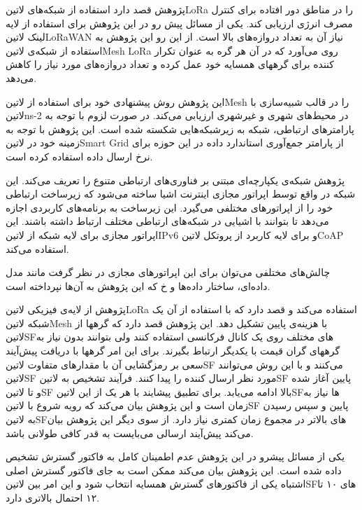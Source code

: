 پژوهش  قصد دارد استفاده از شبکه‌های ‌لاتین{LoRa} را در مناطق دور افتاده برای کنترل مصرف انرژی ارزیابی کند.
یکی از مسائل پیش رو در این پژوهش برای استفاده از لایه لینک ‌لاتین{LoRaWAN} نیاز آن به تعداد دروازه‌های بالا است.
از این رو این پژوهش به استفاده از شبکه‌ی ‌لاتین{Mesh LoRa} روی می‌آورد که در آن هر گره به عنوان تکرار کننده برای گرههای همسایه خود عمل کرده
و تعداد دروازه‌های مورد نیاز را کاهش می‌دهد.

این پژوهش روش پیشنهادی خود برای استفاده از ‌لاتین{Mesh} را در قالب شبیه‌سازی با ‌لاتین{ns-2} در محیط‌های شهری و غیرشهری ارزیابی می‌کند.
در صورت لزوم با توجه به پارامترهای ارتباطی، شبکه به زیرشبکه‌هایی شکسته شده است.
این پژوهش با توجه به زمینه خود در ‌لاتین{Smart Grid} از پارامتر جمع‌آوری استاندارد داده در این حوزه برای نرخ ارسال داده استفاده کرده است.



پژوهش  شبکه‌ی یکپارچه‌ای مبتنی بر فناوری‌های ارتباطی متنوع را تعریف می‌کند. این شبکه در واقع توسط اپراتور مجازی اینترنت اشیا
ساخته می‌شود که زیرساخت ارتباطی خود را از اپراتورهای مختلفی می‌گیرد. این زیرساخت به برنامه‌های کاربردی اجازه می‌دهد تا بتوانند با اشیایی در شبکه‌های ارتباطی مختلف ارتباط داشته باشند.
این اپراتور مجازی برای لایه شبکه از ‌لاتین{IPv6} و برای لایه کاربرد از پروتکل ‌لاتین{CoAP} استفاده می‌کند.

چالش‌های مختلفی می‌توان برای این اپراتورهای مجازی در نظر گرفت مانند مدل داده‌ای، ساختار داده‌ها و ‌خ که این پژوهش به آن‌ها نپرداخته است.


پژوهش  از لایه‌ی فیزیکی ‌لاتین{LoRa} استفاده می‌کند و قصد دارد که با استفاده از آن یک شبکه ‌لاتین{Mesh} با هزینه‌ی پایین تشکیل دهد.
این پژوهش قصد دارد که گرهها از ‌لاتین{SF}های مختلف روی یک کانال فرکانسی استفاده کنند ولی بتوانند بدون نیاز به گرههای گران قیمت با یکدیگر ارتباط بگیرند.
برای این امر گرهها با دریافت پیش‌آیند سعی بر رمزگشایی آن با مقدارهای متفاوت ‌لاتین{SF} می‌کنند و با این روش می‌توانند ‌لاتین{SF} مورد نظر ارسال کننده را پیدا کنند.
فرآیند تشخیص به ‌لاتین{SF} پایین آغاز شده و تا ‌لاتین{SF} بالا ادامه می‌یابد. برای تطبیق پیشایند با هر یک از این ‌لاتین{SF}ها نیاز به زمان است
و این پژوهش بیان می‌کند که رویه شروع با ‌لاتین{SF} پایین و سپس رسیدن به ‌لاتین{SF}های بالاتر در مجموع زمان کمتری نیاز دارد.
از سوی دیگر این پژوهش بیان می‌کند پیش‌آیند ارسالی می‌بایست به قدر کافی طولانی باشد.

یکی از مسائل پیشرو در این پژوهش عدم اطمینان کامل به فاکتور گسترش تشخیص داده شده است.
این پژوهش بیان می‌کند ممکن است به جای فاکتور گسترش اصلی اشتباه یکی از فاکتورهای گسترش همسایه انتخاب شود و
این امر بین ‌لاتین{SF}های ۱۰ تا ۱۲ احتمال بالاتری دارد.


